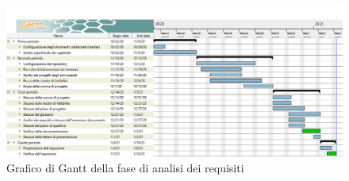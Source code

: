 \begin{landscape}
	\begin{figure}[H]
		\centering
		\includegraphics[width=\linewidth]{res/images/ganttAnalisiDeiRequisiti.png}
		\caption{Grafico di Gantt della fase di analisi dei requisiti}
		\label{fig:Gantt Analisi dei requisiti}
	\end{figure}
\end{landscape}


